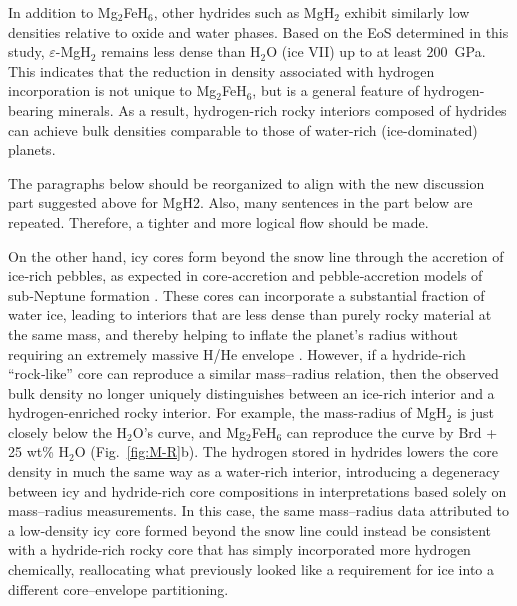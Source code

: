 \documentclass[draft,jgrga,12pt]{agujournal2019}
\begin{document}
In addition to Mg$_2$FeH$_6$, other hydrides such as MgH$_2$ exhibit similarly low densities relative to oxide and water phases. Based on the EoS determined in this study, $\varepsilon$-MgH$_2$ remains less dense than H$_2$O (ice VII) up to at least 200~GPa. This indicates that the reduction in density associated with hydrogen incorporation is not unique to Mg$_2$FeH$_6$, but is a general feature of hydrogen-bearing minerals. As a result, hydrogen-rich rocky interiors composed of hydrides can achieve bulk densities comparable to those of water-rich (ice-dominated) planets.

\begin{cbox}
The paragraphs below should be reorganized to align with the new discussion part suggested above for MgH2. Also, many sentences in the part below are repeated. Therefore, a tighter and more logical flow should be made. \\
\XWrevised
\end{cbox}

On the other hand, icy cores form beyond the snow line through the accretion of ice‑rich pebbles, as expected in core‑accretion and pebble‑accretion models of sub‑Neptune formation \cite{bitsch_dry_2021, bean_nature_2021, burn_radius_2024, venturini_nature_2020}. These cores can incorporate a substantial fraction of water ice, leading to interiors that are less dense than purely rocky material at the same mass, and thereby helping to inflate the planet’s radius without requiring an extremely massive H/He envelope \cite{zeng_growth_2019}. 
However, if a hydride‑rich “rock‑like” core can reproduce a similar mass–radius relation, then the observed bulk density no longer uniquely distinguishes between an ice-rich interior and a hydrogen-enriched rocky interior. 
For example, the mass-radius of MgH$_2$ is just closely below the H$_2$O's curve, and Mg$_2$FeH$_6$ can reproduce the curve by Brd + 25 wt\% H$_2$O (Fig.~\ref{fig:M-R}b). 
The hydrogen stored in hydrides  lowers the core density in much the same way as a water‑rich interior, introducing a degeneracy between icy and hydride-rich core compositions in interpretations based solely on mass--radius measurements.
In this case, the same mass–radius data attributed to a low‑density icy core formed beyond the snow line could instead be consistent with a hydride‑rich rocky core that has simply incorporated more hydrogen chemically, reallocating what previously looked like a requirement for ice into a different core–envelope partitioning.
\end{document}
